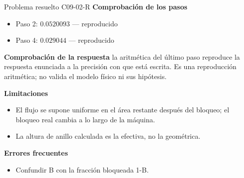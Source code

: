 \documentclass[10pt,openany]{book}
\begin{document}
\begin{studiumworked}{Problema resuelto C09-02-R}
\noindent\textbf{Comprobación de los pasos}
\begin{itemize}
\item Paso 2: $0.0520093$ — reproducido
\item Paso 4: $0.029044$ — reproducido
\end{itemize}

\noindent\textbf{Comprobación de la respuesta} la aritmética del último paso reproduce la respuesta enunciada a la precisión con que está escrita. Es una reproducción aritmética; no valida el modelo físico ni sus hipótesis.

\noindent\textbf{Limitaciones}
\begin{itemize}
\item El flujo se supone uniforme en el área restante después del bloqueo; el bloqueo real cambia a lo largo de la máquina.
\item La altura de anillo calculada es la efectiva, no la geométrica.
\end{itemize}

\noindent\textbf{Errores frecuentes}
\begin{itemize}
\item Confundir B con la fracción bloqueada 1-B.
\end{itemize}
\end{studiumworked}
\end{document}
